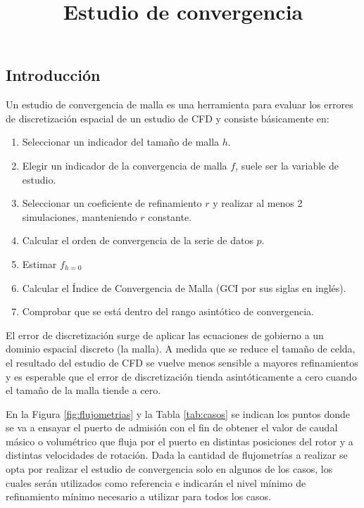 \documentclass[11pt]{article}
\title{Estudio de convergencia}
\author{}
\date{}
\begin{document}
\maketitle

\subsection{Introducción}

Un estudio de convergencia de malla es una herramienta para evaluar los errores
de discretización espacial de un estudio de CFD y consiste básicamente en:

\begin{enumerate}
    \item Seleccionar un indicador del tamaño de malla $h$.
    \item Elegir un indicador de la convergencia de malla $f$, suele ser la
        variable de estudio.
    \item Seleccionar un coeficiente de refinamiento $r$ y realizar al menos 2
        simulaciones, manteniendo $r$ constante.
    \item Calcular el orden de convergencia de la serie de datos $p$.
    \item Estimar $f_{h=0}$
    \item Calcular el Índice de Convergencia de Malla (GCI por sus siglas en
        inglés).
    \item Comprobar que se está dentro del rango asintótico de convergencia.
\end{enumerate}

El error de discretización surge de aplicar las ecuaciones de gobierno a un
dominio espacial discreto (la malla).
%
A medida que se reduce el tamaño de celda, el resultado del estudio de CFD se
vuelve menos sensible a mayores refinamientos y es esperable que el error de
discretización tienda asintóticamente a cero cuando el tamaño de la malla
tiende a cero.

En la Figura \ref{fig:flujometrias} y la Tabla \ref{tab:casos} se indican los
puntos donde se va a ensayar el puerto de admisión con el fin de obtener el
valor de caudal másico o volumétrico que fluja por el puerto en distintas
posiciones del rotor y a distintas velocidades de rotación.
%
Dada la cantidad de flujometrías a realizar se opta por realizar el estudio de
convergencia solo en algunos de los casos, los cuales serán utilizados como
referencia e indicarán el nivel mínimo de refinamiento mínimo necesario a
utilizar para todos los casos.
\end{document}
